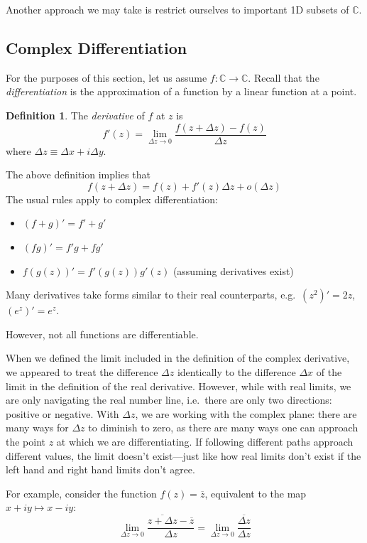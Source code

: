\documentclass[10pt]{scrartcl}
\numberwithin{equation}{subsection}
\theoremstyle{definition}
\newtheorem{definition}{Definition}[section]
\theoremstyle{remark}
\newenvironment{definitionSR}
	{
		\begin{siderules}
			\begin{definition}
			}
			{
			\end{definition}
		\end{siderules}
	}
\newcommand{\Complex}{\mathbb{C}}
\newcommand*{\conjugate}[1]{\overline{#1}}
\begin{document}
Another approach we may take is restrict ourselves to important 1D subsets of  
$\Complex$.
\subsection{Complex Differentiation}
For the purposes of this section, let us assume $f : \Complex \to \Complex$.
Recall that the \textit{differentiation} is the approximation of a function by a
linear function at a point.
\begin{definitionSR}
	The \textit{derivative} of $f$ at $z$ is
	\begin{equation*}
		f'(z) = \lim_{\Delta z \to 0} \frac{f(z + \Delta z) -
		f(z)}{\Delta z}
	\end{equation*}
	where $\Delta z \equiv \Delta x + i \Delta y$.
\end{definitionSR}
The above definition implies that
\begin{equation}
	f(z + \Delta z) = f(z) + f'(z) \Delta z + o(\Delta z)
\end{equation}
The usual rules apply to complex differentiation:
\begin{itemize}
	\item $(f + g)' = f' + g'$
	\item $(fg)' = f'g + fg'$ 
	\item $f(g(z))' = f'(g(z))g'(z)$ (assuming derivatives exist)
\end{itemize}
Many derivatives take forms similar to their real counterparts, e.g.\ $(z^2)' =
2z$, $(e^z)' = e^z$. 

However, not all functions are differentiable. 

When we defined the limit included in the definition of the complex derivative,
we appeared to treat
the difference $\Delta z$  identically to the difference $\Delta x$ of the
limit in the definition of the real derivative.
However, while with real limits, we are only navigating the real number line,
i.e.\ there are only two directions: positive or negative. With $\Delta z$, we
are working with the complex plane: there are many ways for $\Delta z$ to
diminish to zero, as there are many ways one can approach the point $z$ at
which we are differentiating. If following different paths approach different
values, the limit doesn't exist---just like how real limits don't exist if the
left hand and right hand limits don't agree. 

For example, consider the
function $f(z) = \conjugate{z}$, equivalent to the map $x+iy \mapsto x-iy$:
\[
	\lim_{\Delta z \to 0} \frac{\conjugate{z + \Delta z} -
	\conjugate{z}}{\Delta z} = \lim_{\Delta z \to 0}
	\frac{\conjugate{\Delta z}}{\Delta z}
\]
\end{document}
